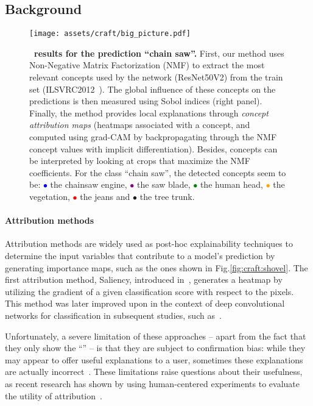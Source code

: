 \subsection{Background}

\begin{figure*}[t!]\centering
\texttt{[image: assets/craft/big\_picture.pdf]}
\caption{\textbf{\craft~results for the prediction ``chain saw''.} 
First, our method uses Non-Negative Matrix Factorization (NMF) to extract the most relevant concepts used by the network (ResNet50V2) from the train set (ILSVRC2012~\cite{imagenet_cvpr09}). The global influence of these concepts on the predictions is then measured using Sobol indices (right panel). Finally, the method provides local explanations through \textit{concept attribution maps} (heatmaps associated with a concept, and computed using grad-CAM by backpropagating through the NMF concept values with implicit differentiation).
Besides, concepts can be interpreted by looking at crops that maximize the NMF coefficients. For the class ``chain saw'', the detected concepts seem to be:
\textcolor{blue}{$\bullet$} the chainsaw engine, 
\textcolor{purple}{$\bullet$} the saw blade, 
\textcolor{green}{$\bullet$} the human head, 
\textcolor{orange}{$\bullet$} the vegetation, 
\textcolor{red}{$\bullet$} the jeans and
\textcolor{dark}{$\bullet$} the tree trunk.
}
\label{fig:craft:craft_demo}
\end{figure*}


\paragraph{Attribution methods}

Attribution methods are widely used as post-hoc explainability techniques to determine the input variables that contribute to a model's prediction by generating importance maps, such as the ones shown in Fig.\ref{fig:craft:shovel}. The first attribution method, Saliency, introduced in~\cite{zeiler2014visualizing}, generates a heatmap by utilizing the gradient of a given classification score with respect to the pixels. This method was later improved upon in the context of deep convolutional networks for classification in subsequent studies, such as~\cite{zeiler2013visualizing, springenberg2014striving, sundararajan2017axiomatic, smilkov2017smoothgrad}.

Unfortunately, a severe limitation of these approaches -- apart from the fact that they only show the ``\where'' -- is that they are subject to confirmation bias: while they may appear to offer useful explanations to a user, sometimes these explanations are actually incorrect~\cite{adebayo2018sanity, ghorbani2017interpretation,slack2020fooling}.
These limitations raise questions about their usefulness, as recent research has shown by using human-centered experiments to evaluate the utility of attribution~\cite{hase2020evaluating,nguyen2021effectiveness,fel2021cannot,kim2021hive,shen2020useful}.

